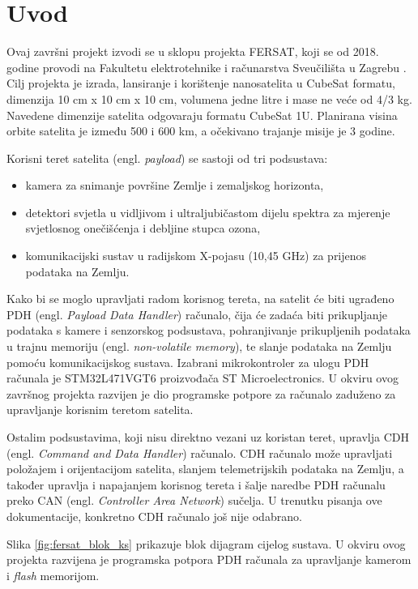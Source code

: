 \chapter{Uvod}

Ovaj završni projekt izvodi se u sklopu projekta FERSAT, koji se od 2018. godine provodi na Fakultetu elektrotehnike i računarstva Sveučilišta u Zagrebu \cite{fersat_stranica_projekta}. Cilj projekta je izrada, lansiranje i korištenje nanosatelita u CubeSat formatu, dimenzija 10 cm x 10 cm x 10 cm, volumena jedne litre i mase ne veće od 4/3 kg. Navedene dimenzije satelita odgovaraju formatu CubeSat 1U. Planirana visina orbite satelita je između 500 i 600 km, a očekivano trajanje misije je 3 godine. 
 
Korisni teret satelita (engl. \textit{payload}) se sastoji od tri podsustava:

\begin{itemize}
	\item kamera za snimanje površine Zemlje i zemaljskog horizonta,
	\item detektori svjetla u vidljivom i ultraljubičastom dijelu spektra za mjerenje svjetlosnog onečišćenja i debljine stupca ozona,
	\item komunikacijski sustav u radijskom X-pojasu (10,45 GHz) za prijenos podataka na Zemlju.
\end{itemize}

Kako bi se moglo upravljati radom korisnog tereta, na satelit će biti ugrađeno PDH (engl. \textit{Payload Data Handler}) računalo, čija će zadaća biti prikupljanje podataka s kamere i senzorskog podsustava, pohranjivanje prikupljenih podataka u trajnu memoriju (engl. \textit{non-volatile memory}), te slanje podataka na Zemlju pomoću komunikacijskog sustava. Izabrani mikrokontroler za ulogu PDH računala je STM32L471VGT6 proizvođača ST Microelectronics.
U okviru ovog završnog projekta razvijen je dio programske potpore za računalo zaduženo za upravljanje korisnim teretom satelita.

Ostalim podsustavima, koji nisu direktno vezani uz koristan teret, upravlja CDH (engl. \textit{Command and Data Handler}) računalo. CDH računalo može upravljati položajem i orijentacijom satelita, slanjem telemetrijskih podataka na Zemlju, a također upravlja i napajanjem korisnog tereta i šalje naredbe PDH računalu preko CAN (engl. \textit{Controller Area Network}) sučelja. U trenutku pisanja ove dokumentacije, konkretno CDH računalo još nije odabrano.
    
Slika \ref{fig:fersat_blok_ks} prikazuje blok dijagram cijelog sustava. U okviru ovog projekta razvijena je programska potpora PDH računala za upravljanje kamerom i \textit{flash} memorijom.

